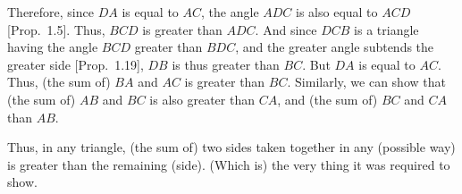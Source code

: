 \begin{Parallel}{}{}
{Therefore, since $DA$ is equal to $AC$, the angle $ADC$ is also equal to
$ACD$ [Prop.~1.5]. Thus, $BCD$ is greater than $ADC$. And since
 $DCB$ is a triangle having the angle $BCD$ greater than $BDC$, and the
greater angle subtends the greater side [Prop.~1.19], $DB$ is thus
greater than $BC$. But $DA$ is equal to $AC$. Thus, (the sum of) $BA$ and $AC$ is
greater than $BC$. Similarly, we can show that (the sum of) $AB$ and $BC$ is also
greater than $CA$, and (the sum of) $BC$ and $CA$ than $AB$.

Thus, in any triangle, (the sum of) two sides taken together in any (possible way) is greater than the remaining (side). (Which is) the very thing
it was required to show.}
\end{Parallel}

